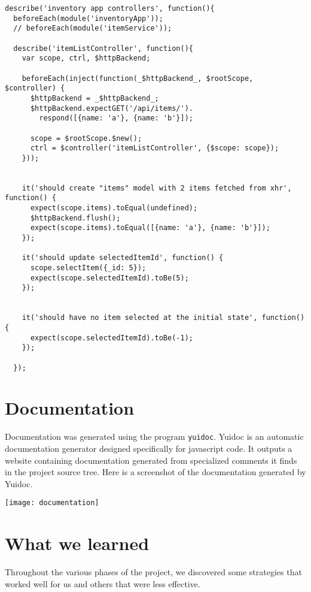 \documentclass[letterpaper, 12pt]{article}
\begin{document}
\begingroup
    \fontsize{10pt}{12pt}\selectfont
\vspace{-3mm}\begin{verbatim}
describe('inventory app controllers', function(){
  beforeEach(module('inventoryApp'));
  // beforeEach(module('itemService'));

  describe('itemListController', function(){
    var scope, ctrl, $httpBackend;

    beforeEach(inject(function(_$httpBackend_, $rootScope, $controller) {
      $httpBackend = _$httpBackend_;
      $httpBackend.expectGET('/api/items/').
        respond([{name: 'a'}, {name: 'b'}]);

      scope = $rootScope.$new();
      ctrl = $controller('itemListController', {$scope: scope});
    }));


    it('should create "items" model with 2 items fetched from xhr', function() {
      expect(scope.items).toEqual(undefined);
      $httpBackend.flush();
      expect(scope.items).toEqual([{name: 'a'}, {name: 'b'}]);
    });

    it('should update selectedItemId', function() {
      scope.selectItem({_id: 5});
      expect(scope.selectedItemId).toBe(5);
    });


    it('should have no item selected at the initial state', function() {
      expect(scope.selectedItemId).toBe(-1);
    });

  });
\end{verbatim}
\endgroup

\section{Documentation}
Documentation was generated using the program \texttt{yuidoc}.  Yuidoc is an automatic documentation generator designed specifically for javascript code.  It outputs a website containing documentation generated from specialized comments it finds in the project source tree. Here is a screenshot of the documentation generated by Yuidoc.

  \begin{centering}
  \texttt{[image: documentation]}
    \end{centering}

\section{What we learned}
Throughout the various phases of the project, we discovered some strategies that worked well for us and others that were less effective.
\end{document}
